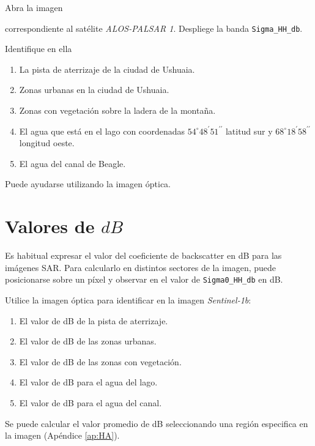 Abra la imagen
\begin{center}
\end{center}
correspondiente al satélite \emph{ALOS-PALSAR 1}. Despliege la banda \texttt{Sigma\_HH\_db}.

Identifique en ella

\begin{enumerate}
    \item La pista de aterrizaje de la ciudad de Ushuaia.
    \item Zonas urbanas en la ciudad de Ushuaia.
    \item Zonas con vegetación sobre la ladera de la montaña.
    \item El agua que está en el lago con coordenadas $54^\circ 48^\prime 51^{\prime\prime}$ latitud sur y $68^\circ 18^\prime 58^{\prime\prime}$ longitud oeste.
    \item El agua del canal de Beagle.
\end{enumerate}

Puede ayudarse utilizando la imagen óptica.


\section{Valores de $dB$}

Es habitual expresar el valor del coeficiente de backscatter en dB para las imágenes SAR. Para calcularlo en distintos sectores de la imagen, puede posicionarse sobre un píxel y observar en  el valor de \texttt{Sigma0\_HH\_db} en dB.


Utilice la imagen óptica para identificar en la imagen \emph{Sentinel-1b}:

 \begin{enumerate}
     \item El valor de dB de la pista de aterrizaje.
     \item El valor de dB de las zonas urbanas.
     \item El valor de dB de las zonas con vegetación.
     \item El valor de dB para el agua del lago.
     \item El valor de dB para el agua del canal.
 \end{enumerate}

Se puede calcular el valor promedio de dB seleccionando una región especifica en la imagen (Apéndice \ref{ap:HA}).

